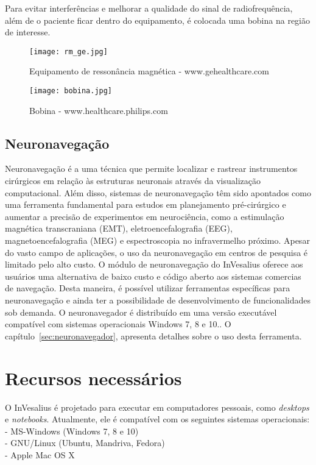 Para evitar interferências e melhorar a qualidade do sinal de radiofrequência, além de o
paciente ficar dentro do equipamento, é colocada uma bobina na região de interesse.

 
\begin{figure}[!htb]
\centering
\texttt{[image: rm\_ge.jpg]}
\caption{Equipamento de ressonância magnética - www.gehealthcare.com}
\end{figure}

\begin{figure}[!htb]
\centering
\texttt{[image: bobina.jpg]}
\caption{Bobina - www.healthcare.philips.com}
\end{figure}

\subsection{Neuronavegação}
\label{sec:neuronavegador_intro}

Neuronavegação é a uma técnica que permite localizar e rastrear instrumentos cirúrgicos em relação às estruturas neuronais através da visualização computacional. Além disso, sistemas de neuronavegação têm sido apontados como uma ferramenta fundamental para estudos em planejamento pré-cirúrgico e aumentar a precisão de experimentos em neurociência, como a estimulação magnética transcraniana (EMT), eletroencefalografia (EEG), magnetoencefalografia (MEG) e espectroscopia no infravermelho próximo. Apesar do vasto campo de aplicações, o uso da neuronavegação em centros de pesquisa é limitado pelo alto custo. O módulo de neuronavegação do InVesalius oferece aos usuários uma alternativa de baixo custo e código aberto aos sistemas comercias de navegação. Desta maneira, é possível utilizar ferramentas específicas para neuronavegação e ainda ter a possibilidade de desenvolvimento de funcionalidades sob demanda. O neuronavegador é distribuído em uma versão executável compatível com sistemas operacionais Windows 7, 8 e 10.. O capítulo~\ref{sec:neuronavegador}, apresenta detalhes sobre o uso desta ferramenta.


\section{Recursos necessários}
O InVesalius é projetado para executar em computadores pessoais, como
\textit{desktops} e \textit{notebooks}. Atualmente, ele é compatível com
os seguintes sistemas operacionais:\\
- MS-Windows (Windows 7, 8 e 10)\\
- GNU/Linux (Ubuntu, Mandriva, Fedora)\\
- Apple Mac OS X

